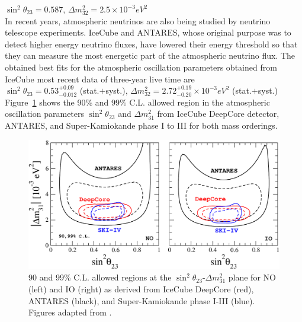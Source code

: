 \documentclass[english]{article}
\begin{document}
    $\sin^{2}{\theta_{23}} = 0.587$, 
    $\Delta{m_{32}^{2}} = 2.5 \times 10^{-3} eV^{2}$\\
    
    In recent years, atmospheric neutrinos are also being studied by neutrino telescope experiments. IceCube and ANTARES, whose original purpose was to detect higher energy neutrino fluxes, have lowered their energy threshold so that they can measure the most energetic part of the atmospheric neutrino flux. The obtained best fits for the atmospheric oscillation parameters obtained from IceCube most recent data of three-year live time \cite{icecube2015} are\\
    
    $\sin^{2}{\theta_{23}} = 0.53^{+0.09}_{-0.012}$ (stat.$+$syst.),  
    $\Delta{m_{32}^{2}} = 2.72^{+0.19}_{-0.20}\times 10^{-3} eV^{2}$ (stat.$+$syst.)\\
    
    Figure~\ref{fig:atmos-exp} shows the 90\% and 99\% C.L. allowed region in the atmospheric oscillation parameters $\sin^{2}{\theta_{23}}$ and $\Delta{m^{2}_{31}}$ from IceCube DeepCore detector, ANTARES, and Super-Kamiokande phase I to III for both mass orderings.
    
    \begin{figure}[!hbt]
		\begin{center}
        \centering
        \captionsetup{justification=centering}
		\includegraphics[scale=0.5]{atmos-exp.pdf}
		\caption{90 and 99\% C.L. allowed regions at the $\sin^{2}{\theta_{23}}$-$\Delta{m^{2}_{31}}$ plane for NO (left) and IO (right) as derived from IceCube DeepCore (red), ANTARES (black), and Super-Kamiokande phase I-III (blue). Figures adapted from \cite{salas2018}.}
		\label{fig:atmos-exp}
		\end{center}
	\end{figure}
\end{document}
